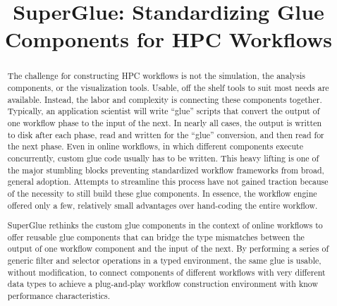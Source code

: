 \documentclass[conference]{IEEEtran}
\begin{document}
\title{SuperGlue: Standardizing Glue Components for HPC Workflows}

\author{
}

\maketitle

\begin{abstract}

The challenge for constructing HPC workflows is not the simulation, the
analysis components, or the visualization tools. Usable, off the shelf tools to
suit most needs are available. Instead, the labor and complexity is connecting
these components together. Typically, an application scientist will write
``glue'' scripts that convert the output of one workflow phase to the input of
the next.  In nearly all cases, the output is written to disk after each
phase, read and written for the ``glue'' conversion, and then read for the next
phase. Even in online workflows, in which different components execute concurrently,
custom glue code usually has to be written.
This heavy lifting is one of the major stumbling blocks preventing
standardized workflow frameworks from broad, general adoption. Attempts to
streamline this process have not gained traction because of the necessity to
still build these glue components. In essence, the workflow engine offered only
a few, relatively small advantages over hand-coding the entire workflow.

SuperGlue rethinks the custom glue components in the context of online
workflows to offer reusable glue components that can bridge the type mismatches
between the output of one workflow component and the input of the next. By
performing a series of generic filter and selector operations in a typed environment, the
same glue is usable, without modification, to connect components of different
workflows with very different data types to achieve a plug-and-play workflow
construction environment with know performance characteristics.

\end{abstract}

\end{document}
